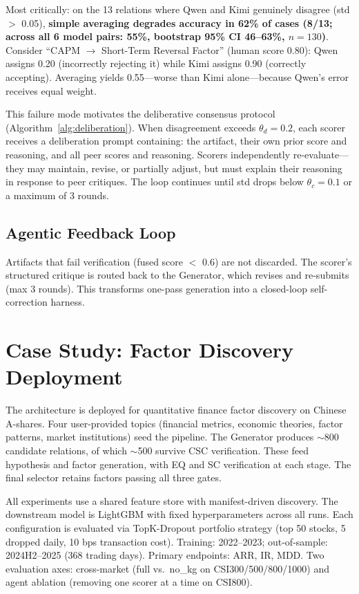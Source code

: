 \documentclass[sigconf]{acmart}
\begin{document}
Most critically: on the 13 relations where Qwen and Kimi genuinely disagree (std $>$ 0.05), \textbf{simple averaging degrades accuracy in 62\% of cases (8/13; across all 6 model pairs: 55\%, bootstrap 95\% CI 46--63\%, $n{=}130$)}. Consider ``CAPM $\rightarrow$ Short-Term Reversal Factor'' (human score 0.80): Qwen assigns 0.20 (incorrectly rejecting it) while Kimi assigns 0.90 (correctly accepting). Averaging yields 0.55---worse than Kimi alone---because Qwen's error receives equal weight.

This failure mode motivates the deliberative consensus protocol (Algorithm~\ref{alg:deliberation}). When disagreement exceeds $\theta_d{=}0.2$, each scorer receives a deliberation prompt containing: the artifact, their own prior score and reasoning, and all peer scores and reasoning. Scorers independently re-evaluate---they may maintain, revise, or partially adjust, but must explain their reasoning in response to peer critiques. The loop continues until std drops below $\theta_c{=}0.1$ or a maximum of 3 rounds.

\subsection{Agentic Feedback Loop}

Artifacts that fail verification (fused score $<$ 0.6) are not discarded. The scorer's structured critique is routed back to the Generator, which revises and re-submits (max 3 rounds). This transforms one-pass generation into a closed-loop self-correction harness.

\section{Case Study: Factor Discovery Deployment}

The architecture is deployed for quantitative finance factor discovery on Chinese A-shares. Four user-provided topics (financial metrics, economic theories, factor patterns, market institutions) seed the pipeline. The Generator produces $\sim$800 candidate relations, of which $\sim$500 survive CSC verification. These feed hypothesis and factor generation, with EQ and SC verification at each stage. The final selector retains factors passing all three gates.

All experiments use a shared feature store with manifest-driven discovery. The downstream model is LightGBM with fixed hyperparameters across all runs. Each configuration is evaluated via TopK-Dropout portfolio strategy (top 50 stocks, 5 dropped daily, 10 bps transaction cost). Training: 2022--2023; out-of-sample: 2024H2--2025 (368 trading days). Primary endpoints: ARR, IR, MDD. Two evaluation axes: cross-market (full vs.\ no\_kg on CSI300/500/800/1000) and agent ablation (removing one scorer at a time on CSI800).
\end{document}
